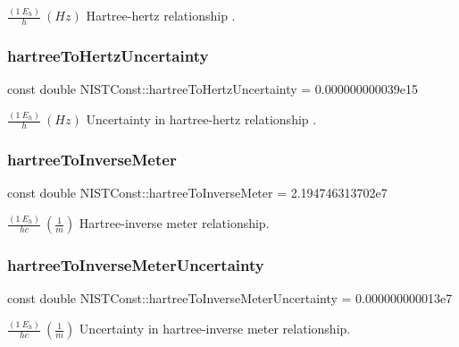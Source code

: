 $\frac{(1\ E_h)}{h} \ (Hz)$ Hartree-\/hertz relationship . \mbox{\label{group___n_i_s_t_const-_hartree_ga97442b1c5b8ece399ff3aebb15064a89}} 
\subsubsection{\texorpdfstring{hartree\+To\+Hertz\+Uncertainty}{hartreeToHertzUncertainty}}
{\footnotesize\ttfamily const double N\+I\+S\+T\+Const\+::hartree\+To\+Hertz\+Uncertainty = 0.\+000000000039e15}

$\frac{(1\ E_h)}{h} \ (Hz)$ Uncertainty in hartree-\/hertz relationship . \mbox{\label{group___n_i_s_t_const-_hartree_ga98d22d0957c639e03a8432aadd02f58f}} 
\subsubsection{\texorpdfstring{hartree\+To\+Inverse\+Meter}{hartreeToInverseMeter}}
{\footnotesize\ttfamily const double N\+I\+S\+T\+Const\+::hartree\+To\+Inverse\+Meter = 2.\+194746313702e7}

$\frac{(1\ E_h)}{hc} \ (\frac{1}{m})$ Hartree-\/inverse meter relationship. \mbox{\label{group___n_i_s_t_const-_hartree_ga0554c0859210dac9ff459c44c1bd70ca}} 
\subsubsection{\texorpdfstring{hartree\+To\+Inverse\+Meter\+Uncertainty}{hartreeToInverseMeterUncertainty}}
{\footnotesize\ttfamily const double N\+I\+S\+T\+Const\+::hartree\+To\+Inverse\+Meter\+Uncertainty = 0.\+000000000013e7}

$\frac{(1\ E_h)}{hc} \ (\frac{1}{m})$ Uncertainty in hartree-\/inverse meter relationship. \mbox{\label{group___n_i_s_t_const-_hartree_ga0c47e6885cdf30ceb56ac3c9420cb81c}} 
